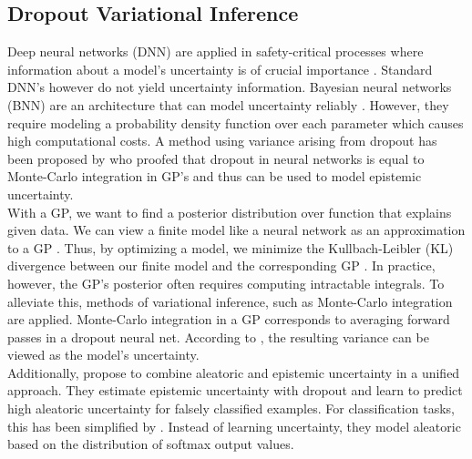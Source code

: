\documentclass[a4paper,cleardoubleempty,BCOR1cm, 11pt]{report}
\begin{document}
\subsection{Dropout Variational Inference} %
Deep neural networks (DNN) are applied in safety-critical processes where information about a model's uncertainty is of crucial importance \cite{najafabadi2015deep,krzywinski2013importance}. Standard DNN's however do not yield uncertainty information. Bayesian neural networks (BNN) are an architecture that can model uncertainty reliably \cite{mullachery2018bayesian}. However, they require modeling a probability density function over each parameter which causes high computational costs. A method using variance arising from dropout has been proposed by \citet{gal2016dropout} who proofed that dropout in neural networks is equal to Monte-Carlo integration in GP's and thus can be used to model epistemic uncertainty.\\
With a GP, we want to find a posterior distribution over function that explains given data. We can view a finite model like a neural network as an approximation to a GP \cite{damianou2013deep}. Thus, by optimizing a model, we minimize the Kullbach-Leibler (KL) divergence between our finite model and the corresponding GP \cite{gal2016dropout}. In practice, however, the GP's posterior often requires computing intractable integrals. To alleviate this, methods of variational inference, such as Monte-Carlo integration are applied. Monte-Carlo integration in a GP corresponds to averaging forward passes in a dropout neural net. According to \citet{gal2016dropout}, the resulting variance can be viewed as the model's uncertainty.
\\
Additionally, \citet{kendall2017uncertainties} propose to combine aleatoric and epistemic uncertainty in a unified approach. They estimate epistemic uncertainty with dropout and learn to predict high aleatoric uncertainty for falsely classified examples.
For classification tasks, this has been simplified by \citet{kwon2020uncertainty}. Instead of learning uncertainty, they model aleatoric based on the distribution of softmax output values.
\end{document}
